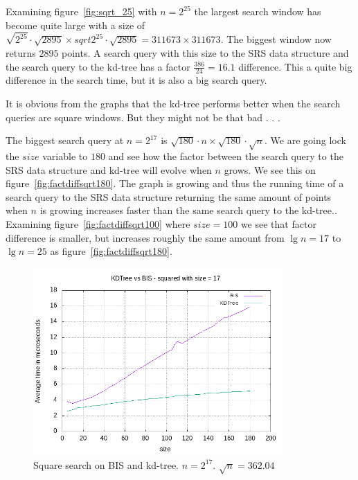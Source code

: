 Examining figure~\ref{fig:sqrt_25} with $n = 2^{25}$ the largest search window has become quite large with a size of $\sqrt{2^{25}}\cdot\sqrt{2895} \times sqrt{2^{25}}\cdot\sqrt{2895} = 311673 \times 311673$. The biggest window now returns $2895$ points. A search query with this size to the SRS data structure and the search query to the kd-tree has a factor $\frac{386}{24} = 16.1$ difference. This a quite big difference in the search time, but it is also a big search query. 


It is obvious from the graphs that the kd-tree performs better when the search queries are square windows. But they might not be that bad . . . 

The biggest search query at $n = 2^{17}$ is $\sqrt{180}\cdot{n} \times \sqrt{180}\cdot\sqrt{n}$. We are going lock the $size$ variable to $180$ and see how the factor between the search query to the SRS data structure and kd-tree will evolve when $n$ grows. We see this on figure~\ref{fig:factdiffsqrt180}. The graph is growing and thus the running time of a search query to the SRS data structure returning the same amount of points when $n$ is growing increases faster than the same search query to the kd-tree.. Examining figure~\ref{fig:factdiffsqrt100} where $size = 100$ we see that factor difference is smaller, but increases roughly the same amount from $\lg n = 17$ to $\lg n = 25$ as figure~\ref{fig:factdiffsqrt180}. 




\begin{figure}[h]
    \centering
    \includegraphics[width = 0.85\textwidth]{pictures/analysis/sqrt_17.png}
    \caption{Square search on BIS and kd-tree. $n=2^{17}$. $\sqrt{n} = 362.04$}\label{fig:sqrt_17}
\end{figure}


